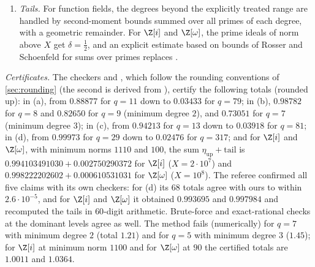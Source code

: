 \begin{enumerate}[label=(\arabic*)]
  $\lfloor(q^n+1)/n\rfloor$ for the number of places of degree $n$ of a function field of genus $0$, and the lists of
  prime ideals of $\Z[i]$ and $\Z[\omega]$.
\item \emph{Tails.} For function fields, the degrees beyond the explicitly treated range are handled by
  second-moment bounds summed over all primes of each degree, with a geometric remainder. For $\Z[i]$ and
  $\Z[\omega]$, the prime ideals of norm above $X$ get $\delta=\frac12$, and an explicit estimate based on bounds of
  Rosser and Schoenfeld \cite{RosserSchoenfeld1962} for sums over primes replaces \cite[Theorem~6.1]{BBMST}.
\end{enumerate}

\emph{Certificates.} The checkers  and , which follow the
rounding conventions of \cref{sec:rounding} (the second is derived from ), certify the following
totals (rounded up): in (a), from $0.88877$ for $q=11$ down to $0.03433$ for $q=79$; in (b), $0.98782$ for $q=8$ and
$0.82650$ for $q=9$ (minimum degree $2$), and $0.73051$ for $q=7$ (minimum degree $3$); in (c), from $0.94213$ for $q=13$
down to $0.03918$ for $q=81$; in (d), from $0.99973$ for $q=29$ down to $0.02476$ for $q=317$; and for $\Z[i]$ and
$\Z[\omega]$, with minimum norms $1110$ and $100$, the sum $\eta_{\mathrm{up}}+\text{tail}$ is $0.994103491030+0.002750290372$ for $\Z[i]$
($X=2\cdot10^7$) and $0.998222202602+0.000610531031$ for $\Z[\omega]$ ($X=10^8$). The referee confirmed all five claims
with its own checkers: for (d) its $68$ totals agree with ours to within $2.6\cdot10^{-5}$, and for $\Z[i]$ and
$\Z[\omega]$ it obtained $0.993695$ and $0.997984$ and recomputed the tails in $60$-digit arithmetic. Brute-force and exact-rational checks at the
dominant levels agree as well. The method fails (numerically) for $q=7$ with minimum degree $2$ (total $1.21$) and for
$q=5$ with minimum degree $3$ ($1.45$); for $\Z[i]$ at minimum norm $1100$ and for $\Z[\omega]$ at $90$ the certified
totals are $1.0011$ and $1.0364$.
